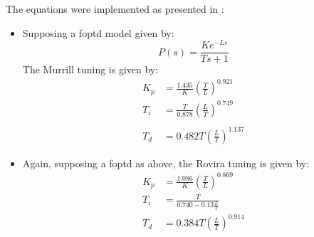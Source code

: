 The equations were implemented as presented in \cite{odwyer2006}:
\begin{itemize}
	\item Supposing a \gls{foptd} model given by:
			\begin{equation*}
				P(s) = \frac{K e^{-L s}}{Ts+1}
			\end{equation*}
			The Murrill tuning is given by:
				\begin{align*}
					K_p &= \frac{1.435}{K}\left( \frac{T}{L} \right)^{0.921}\\
					T_i &= \frac{T}{0.878}\left( \frac{L}{T}\right)^{0.749}\\\\
					T_d &= 0.482 T \left( \frac{L}{T} \right)^{1.137}
				\end{align*}
	\item Again, supposing a \gls{foptd} as above, the Rovira tuning is given by:
			\begin{align*}
				K_p &= \frac{1.086}{K} \left( \frac{T}{L}\right) ^{0.869} \\
				T_i &= \frac{T}{0.740 - 0.13\frac{L}{T}} \\
				T_d &= 0.384 T \left( \frac{L}{T}\right)^{0.914} 
			\end{align*}
\end{itemize}

